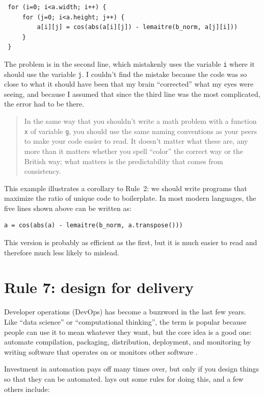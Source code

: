 \documentclass[10pt,letterpaper]{article}
\begin{document}
\begin{verbatim}
 for (i=0; i<a.width; i++) {
     for (j=0; i<a.height; j++) {
         a[i][j] = cos(abs(a[i][j]) - lemaitre(b_norm, a[j][i]))
     }
 }
\end{verbatim}

The problem is in the second line,
which mistakenly uses the variable \texttt{i} where it should use the variable \texttt{j}.
I couldn't find the mistake because
the code was so close to what it should have been that my brain ``corrected'' what my eyes were seeing,
and because I assumed that since the third line was the most complicated,
the error had to be there.

\begin{quotation}
  In the same way that you shouldn't write a math problem with a function \texttt{x} of variable \texttt{g},
  you should use the same naming conventions as your peers
  to make your code easier to read.
  It doesn't matter what these are,
  any more than it matters whether you spell ``color'' the correct way or the British way;
  what matters is the predictability that comes from consistency.
\end{quotation}

This example illustrates a corollary to Rule~2:
we should write programs that maximize the ratio of unique code to boilerplate.
In most modern languages,
the five lines shown above can be written as:

\begin{verbatim}
a = cos(abs(a) - lemaitre(b_norm, a.transpose()))
\end{verbatim}

\noindent
This version is probably as efficient as the first,
but it is much easier to read and therefore much less likely to mislead.

\section*{Rule 7: design for delivery}

Developer operations (DevOps) has become a buzzword in the last few years.
Like ``data science'' or ``computational thinking'',
the term is popular because people can use it to mean whatever they want,
but the core idea is a good one:
automate compilation, packaging, distribution, deployment, and monitoring
by writing software that operates on or monitors other software \cite{Kim2016,Forsgren2018}.

Investment in automation pays off many times over,
but only if you design things so that they can be automated.
\cite{Taschuk2017} lays out some rules for doing this,
and a few others include:
\end{document}
